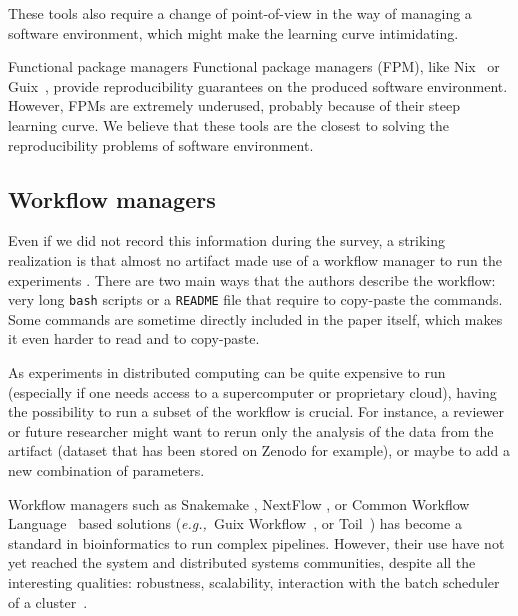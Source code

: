 \documentclass[sigconf,natbib=false]{acmart}
\newcommand{\eg}{\emph{e.g.,}}
\begin{document}
These tools also require a change of point-of-view in the way of managing a software environment, which might make the learning curve intimidating.

\begin{lesson}{Functional package managers}{}
  Functional package managers (FPM), like Nix\ \cite{dolstra_nix_2004} or Guix\ \cite{courtes_functional_2013}, provide reproducibility guarantees on the produced software environment.
  However, FPMs are extremely underused, probably because of their steep learning curve.
  We believe that these tools are the closest to solving the reproducibility problems of software environment.
\end{lesson}

\subsection{Workflow managers}\label{sec:sop:workflow}

Even if we did not record this information during the survey, a striking realization is that almost no artifact made use of a workflow manager to run the experiments .
There are two main ways that the authors describe the workflow: very long \texttt{bash} scripts or a \texttt{README} file that require to copy-paste the commands.
Some commands are sometime directly included in the paper itself, which makes it even harder to read and to copy-paste.

As experiments in distributed computing can be quite expensive to run (especially if one needs access to a supercomputer or proprietary cloud), having the possibility to run a subset of the workflow is crucial.
For instance, a reviewer or future researcher might want to rerun only the analysis of the data from the artifact (dataset that has been stored on Zenodo for example), or maybe to add a new combination of parameters. 

Workflow managers \cite{wratten2021reproducible} such as Snakemake \cite{koster2012snakemake}, NextFlow \cite{di2017nextflow}, or Common Workflow Language\ \cite{amstutz2016common} based solutions (\eg\ Guix Workflow\ \cite{strozzi2019scalable}, or Toil\ \cite{vivian2017toil}) has become a standard in bioinformatics to run complex pipelines.
However, their use have not yet reached the system and distributed systems communities, despite all the interesting qualities: robustness, scalability, interaction with the batch scheduler of a cluster\ \cite{snakemake-executor-plugin-slurm}.
\end{document}
